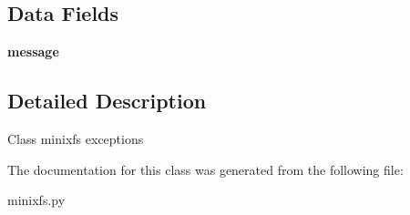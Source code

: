 \subsection*{Data Fields}
\begin{DoxyCompactItemize}
\item 
\hypertarget{classminixfs_1_1_my_base_exception_ab8140947611504abcb64a4c277effcf5}{}{\bfseries message}\label{classminixfs_1_1_my_base_exception_ab8140947611504abcb64a4c277effcf5}

\end{DoxyCompactItemize}


\subsection{Detailed Description}
\begin{DoxyVerb}Class minixfs exceptions  \end{DoxyVerb}
 

The documentation for this class was generated from the following file\+:\begin{DoxyCompactItemize}
\item 
minixfs.\+py\end{DoxyCompactItemize}
